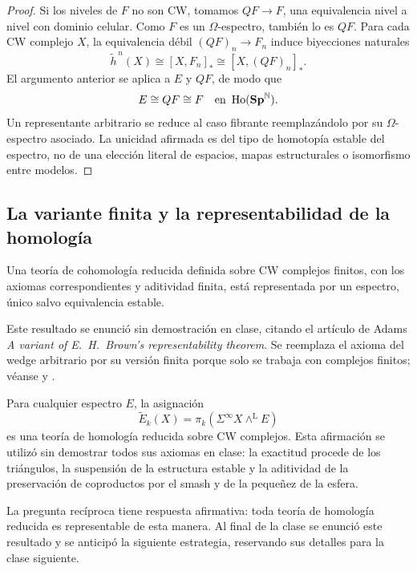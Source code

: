 \begin{proof}
Si los niveles de $F$ no son CW, tomamos $QF\to F$, una equivalencia nivel a nivel con dominio celular. Como $F$ es un $\Omega$-espectro, también lo es $QF$. Para cada CW complejo $X$, la equivalencia débil $(QF)_n\to F_n$ induce biyecciones naturales
\[
\widetilde h^{\,n}(X)\cong[X,F_n]_*
\cong[X,(QF)_n]_*.
\]
El argumento anterior se aplica a $E$ y $QF$, de modo que
\[
E\cong QF\cong F\quad\text{en }\operatorname{Ho}(\mathbf{Sp}^{\mathbb N}).
\]
Un representante arbitrario se reduce al caso fibrante reemplazándolo por su $\Omega$-espectro asociado. La unicidad afirmada es del tipo de homotopía estable del espectro, no de una elección literal de espacios, mapas estructurales o isomorfismo entre modelos.
\end{proof}

\subsection{La variante finita y la representabilidad de la homología}
\begin{teo}\label{teo:c19-adams-finito}
Una teoría de cohomología reducida definida sobre CW complejos finitos, con los axiomas correspondientes y aditividad finita, está representada por un espectro, único salvo equivalencia estable.
\end{teo}
\begin{nota}
Este resultado se enunció sin demostración en clase, citando el artículo de Adams \emph{A variant of E.~H.~Brown's representability theorem}. Se reemplaza el axioma del wedge arbitrario por su versión finita porque solo se trabaja con complejos finitos; véanse \cite{adams1971} y \cite[Teorema~2.5.2.13]{malkiewich}.
\end{nota}

Para cualquier espectro $E$, la asignación
\[
\widetilde E_k(X)=\pi_k(\Sigma^\infty X\wedge^{\mathrm L}E)
\]
es una teoría de homología reducida sobre CW complejos. Esta afirmación se utilizó sin demostrar todos sus axiomas en clase: la exactitud procede de los triángulos, la suspensión de la estructura estable y la aditividad de la preservación de coproductos por el smash y de la pequeñez de la esfera.

La pregunta recíproca tiene respuesta afirmativa: toda teoría de homología reducida es representable de esta manera. Al final de la clase se enunció este resultado y se anticipó la siguiente estrategia, reservando sus detalles para la clase siguiente.

